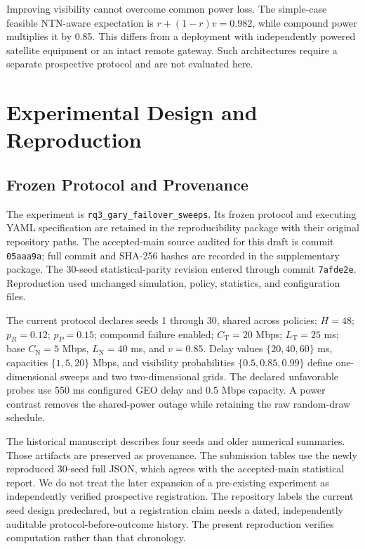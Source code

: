 \documentclass{IEEEoj}
\newcommand{\TN}{\mathrm{T}}
\newcommand{\NTN}{\mathrm{N}}
\begin{document}
Improving visibility cannot overcome common power loss. The simple-case feasible NTN-aware expectation is $r+(1-r)v=0.982$, while compound power multiplies it by 0.85. This differs from a deployment with independently powered satellite equipment or an intact remote gateway. Such architectures require a separate prospective protocol and are not evaluated here.

\section{Experimental Design and Reproduction}
\subsection{Frozen Protocol and Provenance}
The experiment is \texttt{rq3\_gary\_failover\_sweeps}. Its frozen protocol and executing YAML specification are retained in the reproducibility package with their original repository paths. The accepted-main source audited for this draft is commit \texttt{05aaa9a}; full commit and SHA-256 hashes are recorded in the supplementary package. The 30-seed statistical-parity revision entered through commit \texttt{7afde2e}. Reproduction used unchanged simulation, policy, statistics, and configuration files.

The current protocol declares seeds 1 through 30, shared across policies; $H=48$; $p_R=0.12$; $p_P=0.15$; compound failure enabled; $C_\TN=20$ Mbps; $L_\TN=25$ ms; base $C_\NTN=5$ Mbps, $L_\NTN=40$ ms, and $v=0.85$. Delay values $\{20,40,60\}$ ms, capacities $\{1,5,20\}$ Mbps, and visibility probabilities $\{0.5,0.85,0.99\}$ define one-dimensional sweeps and two two-dimensional grids. The declared unfavorable probes use 550 ms configured GEO delay and 0.5 Mbps capacity. A power contrast removes the shared-power outage while retaining the raw random-draw schedule.

The historical manuscript describes four seeds and older numerical summaries. Those artifacts are preserved as provenance. The submission tables use the newly reproduced 30-seed full JSON, which agrees with the accepted-main statistical report. We do not treat the later expansion of a pre-existing experiment as independently verified prospective registration. The repository labels the current seed design predeclared, but a registration claim needs a dated, independently auditable protocol-before-outcome history. The present reproduction verifies computation rather than that chronology.
\end{document}

